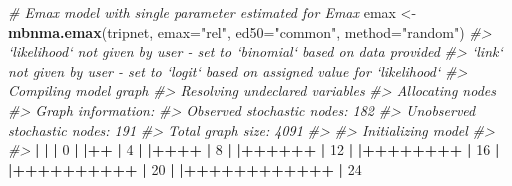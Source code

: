 \documentclass[]{article}
\newenvironment{Shaded}{\begin{snugshade}}{\end{snugshade}}
\newcommand{\CommentTok}[1]{\textcolor[rgb]{0.56,0.35,0.01}{\textit{#1}}}
\newcommand{\DataTypeTok}[1]{\textcolor[rgb]{0.13,0.29,0.53}{#1}}
\newcommand{\DecValTok}[1]{\textcolor[rgb]{0.00,0.00,0.81}{#1}}
\newcommand{\ErrorTok}[1]{\textcolor[rgb]{0.64,0.00,0.00}{\textbf{#1}}}
\newcommand{\KeywordTok}[1]{\textcolor[rgb]{0.13,0.29,0.53}{\textbf{#1}}}
\newcommand{\NormalTok}[1]{#1}
\newcommand{\OperatorTok}[1]{\textcolor[rgb]{0.81,0.36,0.00}{\textbf{#1}}}
\newcommand{\StringTok}[1]{\textcolor[rgb]{0.31,0.60,0.02}{#1}}
\begin{document}
\begin{Shaded}
\begin{Highlighting}[]
\CommentTok{# Emax model with single parameter estimated for Emax}
\NormalTok{emax <-}\StringTok{ }\KeywordTok{mbnma.emax}\NormalTok{(tripnet, }\DataTypeTok{emax=}\StringTok{"rel"}\NormalTok{, }\DataTypeTok{ed50=}\StringTok{"common"}\NormalTok{, }\DataTypeTok{method=}\StringTok{"random"}\NormalTok{)}
\CommentTok{#> `likelihood` not given by user - set to `binomial` based on data provided}
\CommentTok{#> `link` not given by user - set to `logit` based on assigned value for `likelihood`}
\CommentTok{#> Compiling model graph}
\CommentTok{#>    Resolving undeclared variables}
\CommentTok{#>    Allocating nodes}
\CommentTok{#> Graph information:}
\CommentTok{#>    Observed stochastic nodes: 182}
\CommentTok{#>    Unobserved stochastic nodes: 191}
\CommentTok{#>    Total graph size: 4091}
\CommentTok{#> }
\CommentTok{#> Initializing model}
\CommentTok{#> }
\CommentTok{#> }
  \OperatorTok{|}\StringTok{                                                        }
\StringTok{  }\ErrorTok{|}\StringTok{                                                  }\ErrorTok{|}\StringTok{   }\DecValTok{0}\NormalTok{%
  \OperatorTok{|}\StringTok{                                                        }
\StringTok{  }\ErrorTok{|}\OperatorTok{++}\StringTok{                                                }\ErrorTok{|}\StringTok{   }\DecValTok{4}\NormalTok{%
  \OperatorTok{|}\StringTok{                                                        }
\StringTok{  }\ErrorTok{|}\OperatorTok{++++}\StringTok{                                              }\ErrorTok{|}\StringTok{   }\DecValTok{8}\NormalTok{%
  \OperatorTok{|}\StringTok{                                                        }
\StringTok{  }\ErrorTok{|}\OperatorTok{++++++}\StringTok{                                            }\ErrorTok{|}\StringTok{  }\DecValTok{12}\NormalTok{%
  \OperatorTok{|}\StringTok{                                                        }
\StringTok{  }\ErrorTok{|}\OperatorTok{++++++++}\StringTok{                                          }\ErrorTok{|}\StringTok{  }\DecValTok{16}\NormalTok{%
  \OperatorTok{|}\StringTok{                                                        }
\StringTok{  }\ErrorTok{|}\OperatorTok{++++++++++}\StringTok{                                        }\ErrorTok{|}\StringTok{  }\DecValTok{20}\NormalTok{%
  \OperatorTok{|}\StringTok{                                                        }
\StringTok{  }\ErrorTok{|}\OperatorTok{++++++++++++}\StringTok{                                      }\ErrorTok{|}\StringTok{  }\DecValTok{24}\NormalTok{%
}}}}}}}
\end{Highlighting}
\end{Shaded}
\end{document}
